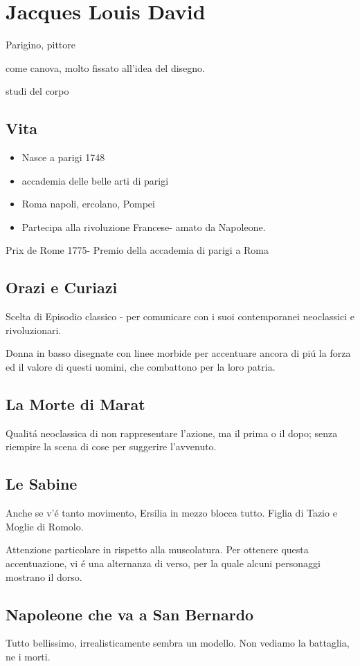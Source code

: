 \documentclass{article}
\begin{document}
\section{Jacques Louis David}
Parigino, pittore

come canova, molto fissato all'idea del disegno.

studi del corpo
\subsection*{Vita}
\begin{itemize}
    \item Nasce a parigi 1748
    \item accademia delle belle arti di parigi
    \item Roma napoli, ercolano, Pompei
    \item Partecipa alla rivoluzione Francese- amato da Napoleone.
\end{itemize}
Prix de Rome 1775- Premio della accademia di parigi a Roma
\subsection{Orazi e Curiazi}
Scelta di Episodio classico - per comunicare con i suoi contemporanei neoclassici e rivoluzionari.

Donna in basso disegnate con linee morbide per accentuare ancora di piú la forza ed il valore di questi uomini, che combattono per la loro patria.
\subsection{La Morte di Marat}
Qualitá neoclassica di non rappresentare l'azione, ma il prima o il dopo; senza riempire la scena di cose per suggerire l'avvenuto.
\subsection{Le Sabine}
Anche se v'é tanto movimento, Ersilia in mezzo blocca tutto. Figlia di Tazio e Moglie di Romolo.

Attenzione particolare in rispetto alla muscolatura. Per ottenere questa accentuazione, vi é una alternanza di verso, per la quale alcuni personaggi mostrano il dorso.
\subsection{Napoleone che va a San Bernardo}
Tutto bellissimo, irrealisticamente sembra un modello. Non vediamo la battaglia, ne i morti.
\end{document}

